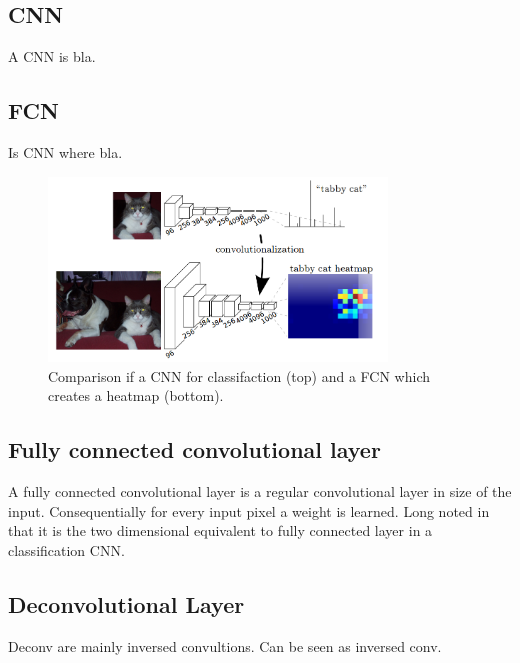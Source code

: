 \subsection{CNN}
A CNN is bla.

\subsection{FCN}
Is CNN where bla.
\begin{figure}[htb]
	\centering
	\includegraphics[width=9cm]{figures/fcnn}
	\caption{Comparison if a CNN for classifaction (top) and a FCN which creates a heatmap (bottom).}
\end{figure}

\subsection{Fully connected convolutional layer}
A fully connected convolutional layer is a regular convolutional layer in size of the input. Consequentially for every input pixel a weight is learned. Long noted in \cite{long2014fully} that it is the two dimensional equivalent to fully connected layer in a classification CNN.

\subsection{Deconvolutional Layer}
Deconv are mainly inversed convultions. Can be seen as inversed conv.
